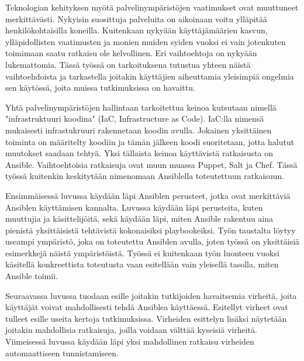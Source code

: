 Teknologian kehityksen myötä palvelinympäristöjen vaatimukset ovat muuttuneet merkittävästi.
Nykyisin suosittuja palveluita on aikoinaan voitu ylläpitää henkilökohtaisilla koneilla.
Kuitenkaan nykyään käyttäjämäärien kasvun, ylläpidollisten vaatimusten ja monien muiden
syiden vuoksi ei vain jotenkuten toimimaan saatu ratkaisu ole kelvollinen. Eri vaihtoehtoja on
nykyään lukemattomia. Tässä työssä on tarkoituksena tutustua yhteen näistä vaihtoehdoista
ja tarkastella joitakin käyttäjien aiheuttamia yleisimpiä ongelmia sen käytössä, joita muissa
tutkimuksissa on havaittu.

Yhtä palvelinympäristöjen hallintaan tarkoitettua keinoa kutsutaan nimellä "infrastruktuuri
koodina" (IaC, Infrastructure as Code). IaC:lla nimensä mukaisesti infrastukruuri rakennetaan
koodin avulla. Jokainen yksittäinen toiminta on määritelty koodiin ja tämän jälkeen koodi
suoritetaan, jotta halutut muutokset saadaan tehtyä. Yksi tällaista keinoa käyttävistä
ratkaisusta on Ansible. Vaihtoehtoisia ratkaisuja ovat muun muassa Puppet, Salt ja Chef.
Tässä työssä kuitenkin keskitytään nimenomaan Ansiblella toteutettuun ratkaisuun.

Ensimmäisessä luvussa käydään läpi Ansiblen perusteet, jotka ovat merkittäviä Ansiblen
käyttämisen kannalta. Luvussa käydään läpi perusteita, kuten muuttujia ja käsittelijöitä,
sekä käydään läpi, miten Ansible rakentuu aina pienistä yksittäisistä tehtävistä kokonaisiksi
playbookeiksi. Työn taustalta löytyy useampi ympäristö, joka on toteutettu Ansiblen avulla,
joten työssä on yksittäisiä esimerkkejä näistä ympäristöistä. Työssä ei kuitenkaan työn
luonteen vuoksi käsitellä konkreettista toteutusta vaan esitellään vain yleisellä tasolla,
miten Ansible toimii.

Seuraavassa luvussa tuodaan esille joitakin tutkijoiden havaitsemia virheitä, joita käyttäjät
voivat mahdollisesti tehdä Ansiblea käyttäessä. Esitellyt virheet ovat tulleet esille useita
kertoja tutkimuksissa. Virheiden esittelyn lisäksi näytetään joitakin mahdollisia ratkaisuja,
joilla voidaan välttää kyseisiä virheitä. Viimeisessä luvussa käydään läpi yksi mahdollinen
ratkaisu virheiden automaattiseen tunnistamiseen.
